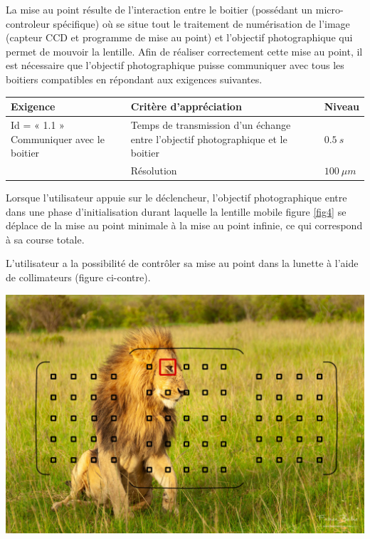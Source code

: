La mise au point résulte de l'interaction entre le boitier (possédant un micro-controleur spécifique) où se situe
tout le traitement de numérisation de l'image (capteur CCD et programme
de mise au point) et l'objectif photographique qui permet de mouvoir la
lentille. Afin de réaliser correctement cette mise au point, il est
nécessaire que l'objectif photographique puisse communiquer avec tous
les boitiers compatibles en répondant aux exigences suivantes.

\begin{tabular}{|p{}|p{}|p{}|}
\hline 
\textbf{Exigence} & \textbf{Critère d'appréciation} & \textbf{Niveau} \\ 
\hline 
Id = « 1.1 » Communiquer avec le boitier & Temps de transmission d'un échange entre l'objectif photographique et le boitier & $\SI{0,5}{s}$ \\ 
\cline{2-3}
& Résolution & $\SI{100}{\mu m}$ \\ 
\hline 
\end{tabular} 


\noindent\begin{minipage}{0.55\textwidth}
Lorsque l'utilisateur appuie sur le déclencheur, l'objectif
photographique entre dans une phase d'initialisation durant laquelle la
lentille mobile figure \ref{fig4} se déplace de
la mise au point minimale à la mise au point infinie, ce qui correspond
à sa course totale.

L'utilisateur a la possibilité de contrôler sa mise au point dans la lunette à l'aide de collimateurs (figure ci-contre).
\end{minipage}\hfill
\begin{minipage}{0.4\textwidth}
\begin{center}
\includegraphics[width=.9\textwidth]{images/collimateurs.jpg}
\end{center}
\end{minipage}

